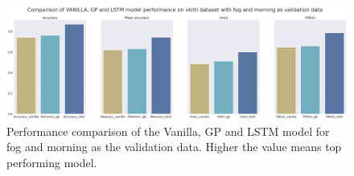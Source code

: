 %		

	\begin{figure}
		\centering
		
		\includegraphics[width=13cm]{images/vkitti_performance_metric_fog_morning.png}
		\caption{Performance comparison of the Vanilla, GP and LSTM model for fog and morning as the validation data. Higher the value means top performing model.}
		\label{fig:performance_metric_vkitti_two_class_box_plot}
	\end{figure}

%		
%
%	
%	
%		
%
%	

